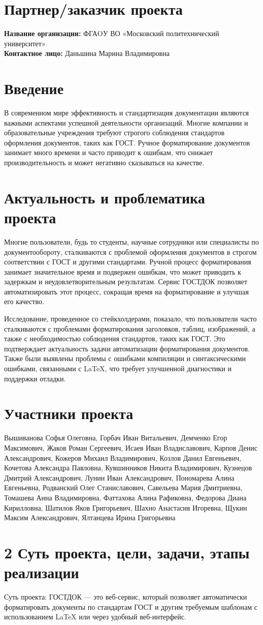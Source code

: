 \documentclass[a4paper,12pt]{article}
\newcommand{\ProjectMembers}{Вышиванова Софья Олеговна, Горбач Иван Витальевич, Демченко Егор Максимович, Жаков Роман Сергеевич, Исаев Иван Владиславович, Карпов Денис Александрович, Кожеров Михаил Владимирович, Козлов Данил Евгеньевич, Кочетова Александра Павловна, Кувшинников Никита Владимирович, Кузнецов Дмитрий Александрович, Лунин Иван Александрович, Пономарева Алина Евгеньевна, Родванский Олег Станиславович, Савельева Мария Дмитриевна, Томашева Анна Владимировна, Фаттахова Алина Рафиковна, Федорова Диана Кирилловна, Шатилов Яков Григорьевич, Шахно Анастасия Игоревна, Щукин Максим Александрович, Ялтанцева Ирина Григорьевна}
\begin{document}
\section*{Партнер/заказчик проекта}
\textbf{Название организации:} ФГАOУ ВО «Московский политехнический университет»\\
\textbf{Контактное лицо:} Даньшина Марина Владимировна

\section*{Введение}
В современном мире эффективность и стандартизация документации являются важными аспектами успешной деятельности организаций. Многие компании и образовательные учреждения требуют строгого соблюдения стандартов оформления документов, таких как ГОСТ. Ручное форматирование документов занимает много времени и часто приводит к ошибкам, что снижает производительность и может негативно сказываться на качестве.

\section{Актуальность и проблематика проекта}
Многие пользователи, будь то студенты, научные сотрудники или специалисты по документообороту, сталкиваются с проблемой оформления документов в строгом соответствии с ГОСТ и другими стандартами. Ручной процесс форматирования занимает значительное время и подвержен ошибкам, что может приводить к задержкам и неудовлетворительным результатам. Сервис ГОСТДОК позволяет автоматизировать этот процесс, сокращая время на форматирование и улучшая его качество.

Исследование, проведенное со стейкхолдерами, показало, что пользователи часто сталкиваются с проблемами форматирования заголовков, таблиц, изображений, а также с необходимостью соблюдения стандартов, таких как ГОСТ. Это подтверждает актуальность задачи автоматизации форматирования документов. Также были выявлены проблемы с ошибками компиляции и синтаксическими ошибками, связанными с LaTeX, что требует улучшенной диагностики и поддержки отладки.

\section{Участники проекта}
\ProjectMembers

\newpage

\section{2 Суть проекта, цели, задачи, этапы реализации}
Суть проекта: ГОСТДОК — это веб-сервис, который позволяет автоматически форматировать документы по стандартам ГОСТ и другим требуемым шаблонам с использованием LaTeX или через удобный веб-интерфейс.
\end{document}
